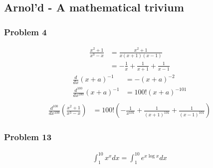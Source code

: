 \documentclass[10pt,a4paper]{article}
\theoremstyle{definition}
\begin{document}
\subsection{{\sc Arnol'd} - A mathematical trivium}
\subsubsection{Problem 4}
\begin{align}
    \frac{x^2+1}{x^3-x}&=\frac{x^2+1}{x(x+1)(x-1)}\\
    &=-\frac{1}{x}+\frac{1}{x+1}+\frac{1}{x-1}
\end{align}
\begin{align}
    \frac{d}{dx}(x+a)^{-1}&=-(x+a)^{-2}\\
    \frac{d^{100}}{dx^{100}}(x+a)^{-1}&=100!(x+a)^{-101}\\
\end{align}
\begin{align}
    \frac{d^{100}}{dx^{100}}\left(\frac{x^2+1}{x^3-x}\right)&=100!\left(-\frac{1}{x^{101}}+\frac{1}{(x+1)^{101}}+\frac{1}{(x-1)^{101}}\right)
\end{align}

\subsubsection{Problem 13}
\begin{align}
    \int_1^{10} x^x dx=\int_1^{10} e^{x\log x} dx
\end{align}
\end{document}
